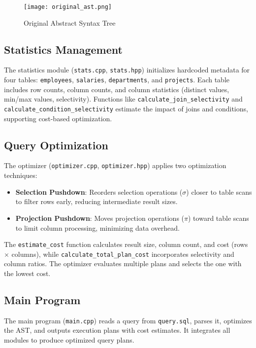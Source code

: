 \documentclass[12pt,a4paper]{article}
\begin{document}
\begin{figure}[H]
    \centering
    \texttt{[image: original\_ast.png]}
    \caption{Original Abstract Syntax Tree}
    \label{fig:original_ast}
\end{figure}

\subsection{Statistics Management}
The statistics module (\texttt{stats.cpp}, \texttt{stats.hpp}) initializes hardcoded metadata for four tables: \texttt{employees}, \texttt{salaries}, \texttt{departments}, and \texttt{projects}. Each table includes row counts, column counts, and column statistics (distinct values, min/max values, selectivity). Functions like \texttt{calculate\_join\_selectivity} and \texttt{calculate\_condition\_selectivity} estimate the impact of joins and conditions, supporting cost-based optimization.

\subsection{Query Optimization}
The optimizer (\texttt{optimizer.cpp}, \texttt{optimizer.hpp}) applies two optimization techniques:
\begin{itemize}
    \item \textbf{Selection Pushdown}: Reorders selection operations ($\sigma$) closer to table scans to filter rows early, reducing intermediate result sizes.
    \item \textbf{Projection Pushdown}: Moves projection operations ($\pi$) toward table scans to limit column processing, minimizing data overhead.
\end{itemize}
The \texttt{estimate\_cost} function calculates result size, column count, and cost (rows $\times$ columns), while \texttt{calculate\_total\_plan\_cost} incorporates selectivity and column ratios. The optimizer evaluates multiple plans and selects the one with the lowest cost.

\subsection{Main Program}
The main program (\texttt{main.cpp}) reads a query from \texttt{query.sql}, parses it, optimizes the AST, and outputs execution plans with cost estimates. It integrates all modules to produce optimized query plans.
\end{document}
